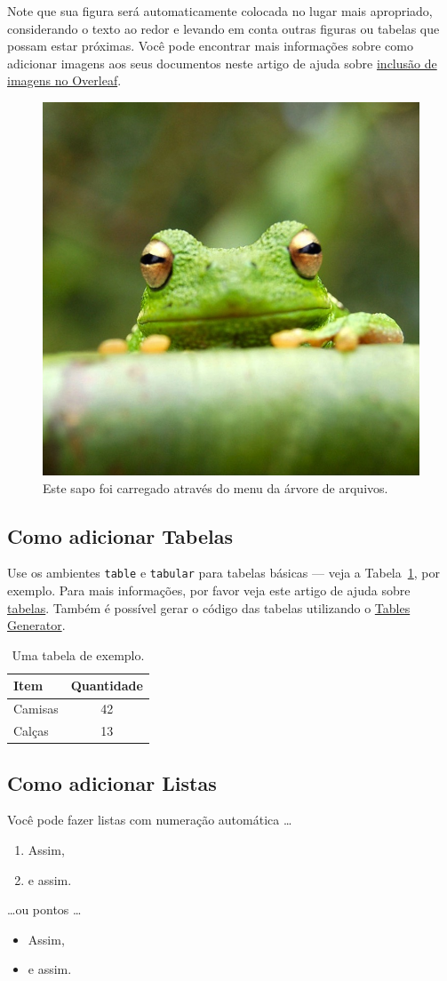 \documentclass{article}
\begin{document}
Note que sua figura será automaticamente colocada no lugar mais apropriado, considerando o texto ao redor e levando em conta outras figuras ou tabelas que possam estar próximas. Você pode encontrar mais informações sobre como adicionar imagens aos seus documentos neste artigo de ajuda sobre \href{https://www.overleaf.com/learn/how-to/Including_images_on_Overleaf}{inclusão de imagens no Overleaf}.

\begin{figure}
\centering
\includegraphics[width=0.25\linewidth]{frog.jpg}
\caption{\label{fig:frog}Este sapo foi carregado através do menu da árvore de arquivos.}
\end{figure}

\subsection{Como adicionar Tabelas}

Use os ambientes \texttt{table} e \texttt{tabular} para tabelas básicas --- veja a Tabela~\ref{tab:widgets}, por exemplo. Para mais informações, por favor veja este artigo de ajuda sobre \href{https://www.overleaf.com/learn/latex/tables}{tabelas}.
%
Também é possível gerar o código das tabelas utilizando o \href{https://www.tablesgenerator.com/}{Tables Generator}.

\begin{table}
\centering
\begin{tabular}{l|c}
Item & Quantidade \\\hline
Camisas & 42 \\
Calças & 13
\end{tabular}
\caption{\label{tab:widgets}Uma tabela de exemplo.}
\end{table}

\subsection{Como adicionar Listas}

Você pode fazer listas com numeração automática \dots

\begin{enumerate}
    \item Assim,
    \item e assim.
\end{enumerate}
\dots ou pontos \dots
\begin{itemize}
    \item Assim,
    \item e assim.
\end{itemize}
\end{document}
